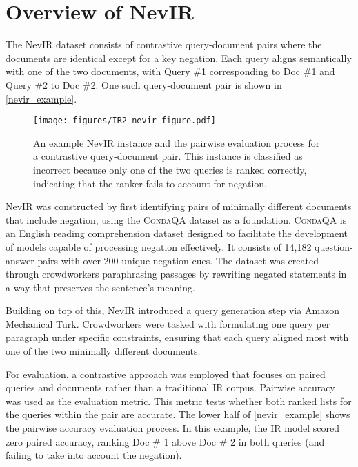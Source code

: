 \section{Overview of NevIR}
The NevIR dataset consists of contrastive query-document pairs where the documents are identical except for a key negation. Each query aligns semantically with one of the two documents, with Query \#1 corresponding to Doc \#1 and Query \#2 to Doc \#2. One such query-document pair is shown in \autoref{nevir_example}.


\begin{figure}[h]

  \centering
  \texttt{[image: figures/IR2\_nevir\_figure.pdf]}
  \caption{An example NevIR instance and the pairwise evaluation process for a contrastive query-document pair. This instance is classified as incorrect because only one of the two queries is ranked correctly, indicating that the ranker fails to account for negation.}

    \label{nevir_example}
\end{figure}
NevIR was constructed by first identifying pairs of minimally different documents that include negation, using the C\textsc{onda}QA dataset \cite{condaqa} as a foundation. C\textsc{onda}QA is an English reading comprehension dataset designed to facilitate the development of models capable of processing negation effectively. It consists of 14,182 question-answer pairs with over 200 unique negation cues. The dataset was created through crowdworkers paraphrasing passages by rewriting negated statements in a way that preserves the sentence’s meaning.

Building on top of this, NevIR introduced a query generation step via Amazon Mechanical Turk. Crowdworkers were tasked with formulating one query per paragraph under specific constraints, ensuring that each query aligned most with one of the two minimally different documents.

For evaluation, a contrastive approach was employed that focuses on paired queries and documents rather than a traditional IR corpus. Pairwise accuracy was used as the evaluation metric. This metric tests whether both ranked lists for the queries within the pair are accurate. The lower half of \autoref{nevir_example} shows the pairwise accuracy evaluation process. In this example, the IR model scored zero paired accuracy, ranking Doc \# 1 above Doc \# 2 in both queries (and failing to take into account the negation).
